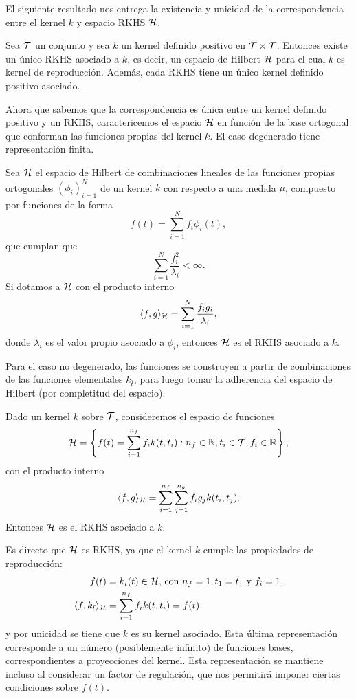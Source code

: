 El siguiente resultado \cite{aronszajn1950theory} nos entrega la existencia y unicidad de la correspondencia entre el kernel \(k\) y espacio RKHS \(\mathcal{H}\).
\begin{theorem} Sea \(\mathcal{T}\) un conjunto y sea \(k\) un kernel definido positivo en \(\mathcal{T} \times \mathcal{T}\). Entonces existe un único RKHS asociado a \(k\), es decir, un espacio de Hilbert \(\mathcal{H}\) para el cual \(k\) es kernel de reproducción. Además, cada RKHS tiene un único kernel definido positivo asociado.
\end{theorem}

Ahora que sabemos que la correspondencia es única entre un kernel definido positivo y un RKHS, caractericemos el espacio \(\mathcal{H}\) en función de la base ortogonal que conforman las funciones propias del kernel \(k\). El caso degenerado tiene representación finita.

\begin{proposition}
	Sea \(\mathcal{H}\) el espacio de Hilbert de combinaciones lineales de las funciones propias ortogonales \((\phi_{i})_{i=1}^{N}\) de un kernel \(k\) con respecto a una medida \(\mu\), compuesto por funciones de la forma
	\[f(t) = \sum_{i=1}^{N} f_{i} \phi_{i}(t),\]
	que cumplan que
	\[\sum_{i=1}^{N} \frac{f_{i}^{2}}{\lambda_{i}} < \infty.\]
	Si dotamos a \(\mathcal{H}\) con el producto interno
	\[\langle f,g \rangle_{\mathcal{H}} = \sum_{i=1}^{N} \frac{f_{i} g_{i}}{\lambda_{i}},\]
	donde \(\lambda_{i}\) es el valor propio asociado a \(\phi_{i}\), entonces \(\mathcal{H}\) es el RKHS asociado a \(k\).
\end{proposition}

Para el caso no degenerado, las funciones se construyen a partir de combinaciones de las funciones elementales \(k_{\bar{t}}\), para luego tomar la adherencia del espacio de Hilbert (por completitud del espacio).
\begin{proposition}[Representante]
	Dado un kernel \(k\) sobre \(\mathcal{T}\), consideremos el espacio de funciones
	\[ \mathcal{H} = \left\{ f(t) = \sum_{i=1}^{n_{f}} f_{i} k(t, t_{i}) : n_{f} \in \mathbb{N}, t_{i}\in \mathcal{T}, f_{i} \in \mathbb{R} \right\},\]
	con el producto interno
	\[\langle f, g\rangle_{\mathcal{H}} = \sum_{i=1}^{n_{f}} \sum_{j=1}^{n_{g}} f_{i}g_{j} k(t_{i}, t_{j}).\]
	Entonces \(\mathcal{H}\) es el RKHS asociado a \(k\).
\end{proposition}

Es directo que \(\mathcal{H}\) es RKHS, ya que el kernel \(k\) cumple las propiedades de reproducción:
\begin{align*}
	f(t)									&= k_{\bar{t}} (t) \in \mathcal{H} \text{, con } n_{f} = 1, t_{1} = \bar{t}, \text{ y } f_{i}=1, \\
	\langle f, k_{\bar{t}} \rangle_{\mathcal{H}}	&= \sum_{i=1}^{n_{f}} f_{i} k(\bar{t}, t_{i}) = f(\bar{t}),
\end{align*}%
y por unicidad se tiene que \(k\) es su kernel asociado. Esta última representación corresponde a un número (posiblemente infinito) de funciones bases, correspondientes a proyecciones del kernel. Esta representación se mantiene incluso al considerar un factor de regulación, que nos permitirá imponer ciertas condiciones sobre \(f(t)\).

